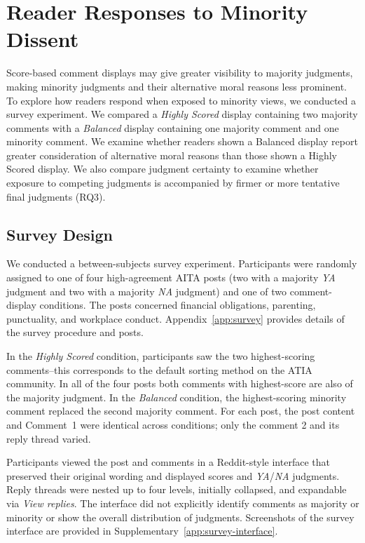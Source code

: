 \section{Reader Responses to Minority Dissent}
\label{sec:method-survey}
Score-based comment displays may give greater visibility to majority judgments, making minority judgments and their alternative moral reasons less prominent.
To explore how readers respond when exposed to minority views, we conducted a survey experiment. We compared a \textit{Highly Scored} display containing two majority comments with a \textit{Balanced} display containing one majority comment and one minority comment. 
We examine whether readers shown a Balanced display report greater consideration of alternative moral reasons than those shown a Highly Scored display. We also compare judgment certainty to examine whether exposure to competing judgments is accompanied by firmer or more tentative final judgments (RQ3).

\subsection{Survey Design}
\label{subsec:survey-design}

We conducted a between-subjects survey experiment. Participants were randomly assigned to one of four high-agreement AITA posts (two with a majority \textit{YA} judgment and two with a majority \textit{NA} judgment) and one of two comment-display conditions. The posts concerned financial obligations, parenting, punctuality, and workplace conduct. Appendix~\ref{app:survey} provides details of the survey procedure and posts.

In the \textit{Highly Scored} condition, participants saw the two highest-scoring comments--this corresponds to the default sorting method on the ATIA community. In all of the four posts both comments with highest-score are also of the majority judgment. In the \textit{Balanced} condition, the highest-scoring minority comment replaced the second majority comment. For each post, the post content and Comment~1 were identical across conditions; only the comment 2 and its reply thread varied. 

Participants viewed the post and comments in a Reddit-style interface
that preserved their original wording and displayed scores and
\textit{YA}/\textit{NA} judgments. Reply threads were nested up to
four levels, initially collapsed, and expandable via \textit{View
replies}. The interface did not explicitly identify comments as
majority or minority or show the overall distribution of judgments.
Screenshots of the survey interface are provided in Supplementary~\ref{app:survey-interface}.

